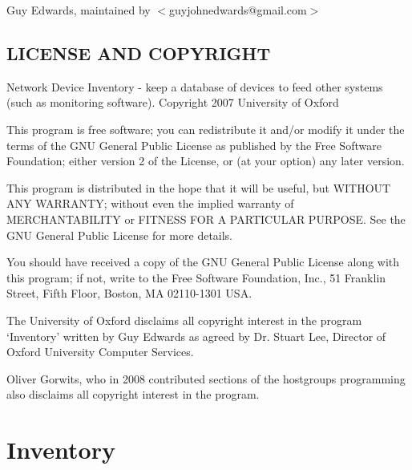 \documentclass{book}
\begin{document}
Guy Edwards, maintained by $<$guyjohnedwards@gmail.com$>$


\subsection{LICENSE AND COPYRIGHT}
\label{Inventory::Cnames_LICENSE_AND_COPYRIGHT}
\hypertarget{Inventory::Cnames_LICENSE_AND_COPYRIGHT}{}



Network Device Inventory - keep a database of devices to feed other systems (such as monitoring software). Copyright 2007 University of Oxford



This program is free software; you can redistribute it and/or modify it under the terms of the GNU General Public License as published by the Free Software Foundation; either version 2 of the License, or (at your option) any later version.



This program is distributed in the hope that it will be useful, but WITHOUT ANY WARRANTY; without even the implied warranty of MERCHANTABILITY or FITNESS FOR A PARTICULAR PURPOSE. See the GNU General Public License for more details.



You should have received a copy of the GNU General Public License along with this program; if not, write to the Free Software Foundation, Inc., 51 Franklin Street, Fifth Floor, Boston, MA 02110-1301 USA.



The University of Oxford disclaims all copyright interest in the program `Inventory' written by Guy Edwards as agreed by Dr. Stuart Lee, Director of Oxford University Computer Services.



Oliver Gorwits, who in 2008 contributed sections of the hostgroups programming also disclaims all copyright interest in the program.




\section{Inventory}
\label{_Inventory::Contacts}
\hypertarget{_Inventory::Contacts}{}
\end{document}
